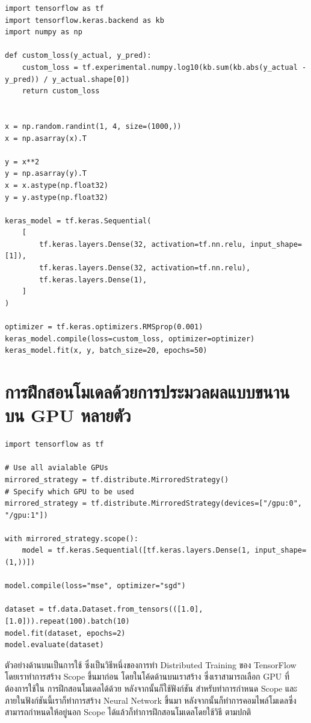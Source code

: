 \begin{lstlisting}[style=MyPython]
import tensorflow as tf
import tensorflow.keras.backend as kb
import numpy as np

def custom_loss(y_actual, y_pred):
    custom_loss = tf.experimental.numpy.log10(kb.sum(kb.abs(y_actual - y_pred)) / y_actual.shape[0])
    return custom_loss


x = np.random.randint(1, 4, size=(1000,))
x = np.asarray(x).T

y = x**2
y = np.asarray(y).T
x = x.astype(np.float32)
y = y.astype(np.float32)

keras_model = tf.keras.Sequential(
    [
        tf.keras.layers.Dense(32, activation=tf.nn.relu, input_shape=[1]),
        tf.keras.layers.Dense(32, activation=tf.nn.relu),
        tf.keras.layers.Dense(1),
    ]
)

optimizer = tf.keras.optimizers.RMSprop(0.001)
keras_model.compile(loss=custom_loss, optimizer=optimizer)
keras_model.fit(x, y, batch_size=20, epochs=50)
\end{lstlisting}

\section{การฝึกสอนโมเดลด้วยการประมวลผลแบบขนานบน GPU หลายตัว}
\label{sec:tf_multi_gpu}

\begin{lstlisting}[style=MyPython]
import tensorflow as tf

# Use all avialable GPUs
mirrored_strategy = tf.distribute.MirroredStrategy()
# Specify which GPU to be used
mirrored_strategy = tf.distribute.MirroredStrategy(devices=["/gpu:0", "/gpu:1"])

with mirrored_strategy.scope():
    model = tf.keras.Sequential([tf.keras.layers.Dense(1, input_shape=(1,))])

model.compile(loss="mse", optimizer="sgd")

dataset = tf.data.Dataset.from_tensors(([1.0], [1.0])).repeat(100).batch(10)
model.fit(dataset, epochs=2)
model.evaluate(dataset)
\end{lstlisting}

ตัวอย่างด้านบนเป็นการใช้  ซึ่งเป็นวิธีหนึ่งของการทำ Distributed Training ของ TensorFlow 
โดยเราทำการสร้าง Scope ขึ้นมาก่อน โดยในโค้ดด้านบนเราสร้าง  ซึ่งเราสามารถเลือก GPU ที่ต้องการใช้ใน%
การฝึกสอนโมเดลได้ด้วย หลังจากนั้นก็ใช้ฟังก์ชัน  สำหรับทำการกำหนด Scope และภายในฟังก์ชันนี้เราก็ทำการสร้าง Neural 
Network ขึ้นมา หลังจากนั้นก็ทำการคอมไพล์โมเดลซึ่งสามารถกำหนดให้อยู่นอก Scope ได้แล้วก็ทำการฝึกสอนโมเดลโดยใช้วิธี 
ตามปกติ
